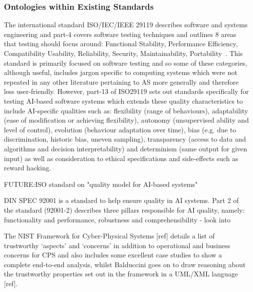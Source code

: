 \subsubsection{Ontologies within Existing Standards}\label{sec:tasq-ont-stds}

The international standard ISO/IEC/IEEE 29119 describes software and systems engineering and part-4 covers software testing techniques and outlines 8 areas that testing should focus around: Functional Stability, Performance Efficiency, Compatibility
Usability, Reliability, Security, Maintainability, Portability~\cite{ISO29119}. 
%
This standard is primarily focused on software testing and so some of these categories, although useful, includes jargon specific to computing systems which were not repeated in any other literature pertaining to AS more generally and therefore less user-friendly. However, part-13 of ISO29119 sets out standards specifically for testing AI-based software systems which extends these quality characteristics to include AI-specific qualities such as: flexibility (range of behaviours), adaptability (ease of modification or achieving flexibility), autonomy (unsupervised ability and level of control), evolution (behaviour adaptation over time), bias (e.g. due to discrimination, historic bias, uneven sampling), transparency (access to data and algorithms and decision interpretability) and determinism (same output for given input) as well as consideration to ethical specifications and side-effects such as reward hacking. 

FUTURE:ISO standard on "quality model for AI-based systems"


DIN SPEC 92001 is a standard to help ensure quality in AI systems. Part 2 of the standard (92001-2) describes three pillars responsible for AI quality, namely: functionality and performance, robustness and comprehensibility - look into

The NIST Framework for Cyber-Physical Systems [ref] details a list of trustworthy `aspects' and `concerns' in addition to operational and business concerns for CPS and also includes some excellent case studies to show a complete end-to-end analysis, whilst Balduccini goes on to draw reasoning about the trustworthy properties set out in the framework in a UML/XML language [ref].  
%





